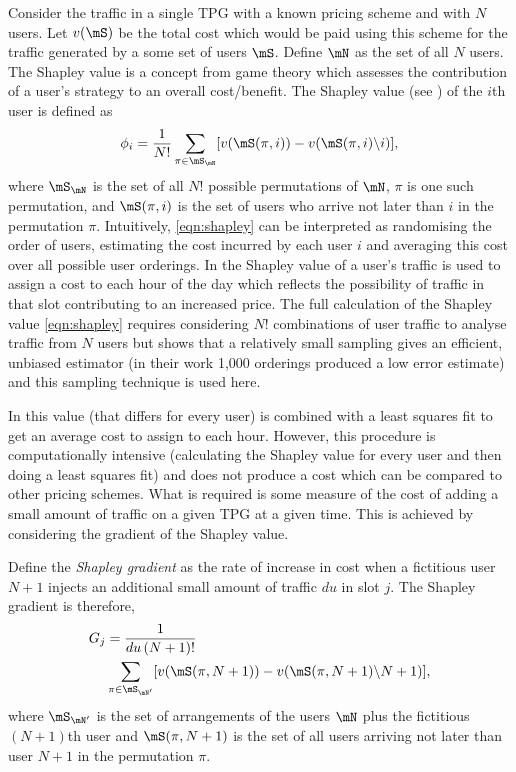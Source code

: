 Consider the traffic in a single TPG with a known pricing scheme and
with $N$ users.
Let
$v(\mS)$ be the total cost which would be paid using
this scheme for the traffic 
generated by a some set of users $\mS$.  Define $\mN$ as the
set of all $N$ users.
The Shapley value is a concept from game theory which assesses the
contribution of a user's strategy to an overall cost/benefit.  The
Shapley value 
(see \cite{stanojevic2010heavy}) of
the $i$th user is defined as 
\begin{equation}
\phi_i = \frac{1}{N!} \sum_{\pi \in \mS_{\mN}} [v(\mS(\pi,i)) - 
v(\mS(\pi,i) \backslash i)] \mbox{,}
\label{eqn:shapley}
\end{equation}
where $\mS_{\mN}$ is the set of all $N!$ possible permutations of $\mN$,
$\pi$ is one such permutation, and $\mS(\pi,i)$ is the set of users who 
arrive not later than $i$ in the permutation $\pi$. 
Intuitively, \eqref{eqn:shapley} can be interpreted as randomising the order of users,
estimating the cost incurred by each user $i$ and averaging this cost over all possible 
user orderings. 
In \cite{stanojevic2010heavy} the Shapley value of a user's traffic
is used to assign a cost to each hour of the day which reflects the possibility
of traffic in that slot contributing to an increased price.
The full calculation of the Shapley
value \eqref{eqn:shapley} requires considering $N!$ combinations
of user traffic to analyse traffic from $N$ users but
\cite{stanojevic2010heavy} shows that a relatively 
small sampling gives
an efficient, unbiased estimator (in their work 1,000 orderings produced
a low error estimate) and this sampling technique is used here.

In \cite{stanojevic2010heavy} this value (that differs for every user)
is combined with a least squares fit to get an average cost to assign
to each hour.  However, this procedure is computationally intensive 
(calculating the Shapley value for every user and then doing a least
squares fit) and does not produce a cost which can be compared 
to other pricing schemes.
What is required is some measure of the cost of adding a small amount
of traffic on a given TPG at a given time.  This is achieved by
considering the gradient of the Shapley value.

Define the \emph{Shapley gradient} as the rate of
increase in cost when a fictitious user $N + 1$
injects an additional small amount of traffic $du$ in slot $j$.  
The Shapley gradient is therefore,  
\begin{align}
\nonumber G_j  &=  
\frac{1}{du\,(N+1)!} \\ 
& \sum_{\pi \in \mS_{\mN'}} [v(\mS(\pi,N+1)) - 
v(\mS(\pi,N+1) \backslash N+1) ],
\label{eqn:Gjgeneral}
\end{align}
where 
$\mS_{\mN'}$ is the set of arrangements of the
users $\mN$ plus the fictitious $(N+1)$th user and 
$\mS(\pi,N+1)$ is the set of all users arriving
not later than user $N+1$ in the permutation $\pi$.

